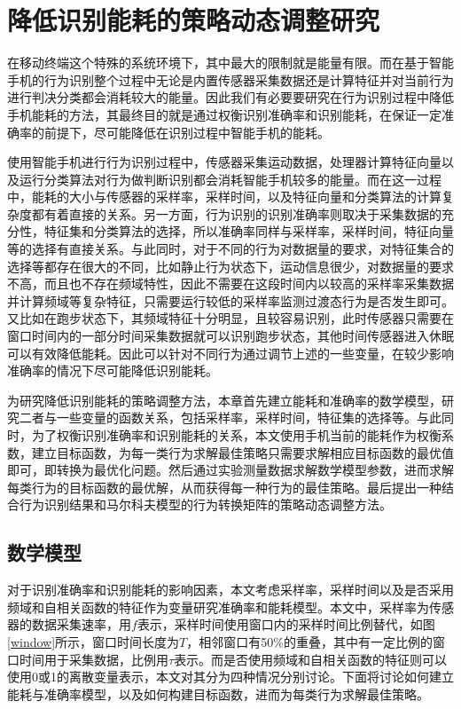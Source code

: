 ﻿\chapter{降低识别能耗的策略动态调整研究}
\par 在移动终端这个特殊的系统环境下，其中最大的限制就是能量有限。而在基于智能手机的行为识别整个过程中无论是内置传感器采集数据还是计算特征并对当前行为进行判决分类都会消耗较大的能量\cite{priyantha2010enabling}。因此我们有必要要研究在行为识别过程中降低手机能耗的方法，其最终目的就是通过权衡识别准确率和识别能耗，在保证一定准确率的前提下，尽可能降低在识别过程中智能手机的能耗。
\par 使用智能手机进行行为识别过程中，传感器采集运动数据，处理器计算特征向量以及运行分类算法对行为做判断识别都会消耗智能手机较多的能量。而在这一过程中，能耗的大小与传感器的采样率，采样时间，以及特征向量和分类算法的计算复杂度都有着直接的关系\cite{rachuri2011sociablesense}。另一方面，行为识别的识别准确率则取决于采集数据的充分性，特征集和分类算法的选择，所以准确率同样与采样率，采样时间，特征向量等的选择有直接关系\cite{ravi2005activity}。与此同时，对于不同的行为对数据量的要求，对特征集合的选择等都存在很大的不同\cite{raffa2010don}，比如静止行为状态下，运动信息很少，对数据量的要求不高，而且也不存在频域特性，因此不需要在这段时间内以较高的采样率采集数据并计算频域等复杂特征，只需要运行较低的采样率监测过渡态行为是否发生即可。又比如在跑步状态下，其频域特征十分明显，且较容易识别，此时传感器只需要在窗口时间内的一部分时间采集数据就可以识别跑步状态，其他时间传感器进入休眠可以有效降低能耗。因此可以针对不同行为通过调节上述的一些变量，在较少影响准确率的情况下尽可能降低识别能耗。
\par 为研究降低识别能耗的策略调整方法，本章首先建立能耗和准确率的数学模型，研究二者与一些变量的函数关系，包括采样率，采样时间，特征集的选择等。与此同时，为了权衡识别准确率和识别能耗的关系，本文使用手机当前的能耗作为权衡系数，建立目标函数，为每一类行为求解最佳策略只需要求解相应目标函数的最优值即可，即转换为最优化问题。然后通过实验测量数据求解数学模型参数，进而求解每类行为的目标函数的最优解，从而获得每一种行为的最佳策略。最后提出一种结合行为识别结果和马尔科夫模型的行为转换矩阵的策略动态调整方法。

\section{数学模型}
\par 对于识别准确率和识别能耗的影响因素，本文考虑采样率，采样时间以及是否采用频域和自相关函数的特征作为变量研究准确率和能耗模型。本文中，采样率为传感器的数据采集速率，用$f$表示，采样时间使用窗口内的采样时间比例替代，如图\ref{window}所示，窗口时间长度为$T$，相邻窗口有50\%的重叠，其中有一定比例的窗口时间用于采集数据，比例用$\tau$表示。而是否使用频域和自相关函数的特征则可以使用0或1的离散变量表示，本文对其分为四种情况分别讨论。下面将讨论如何建立能耗与准确率模型，以及如何构建目标函数，进而为每类行为求解最佳策略。

